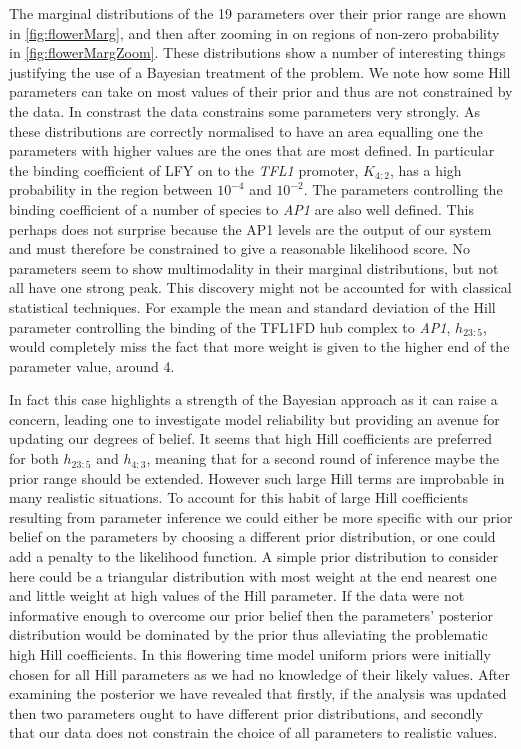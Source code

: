 The marginal distributions of the 19 parameters over their prior range are shown in \autoref{fig:flowerMarg}, and then after zooming in on regions of non-zero probability in \autoref{fig:flowerMargZoom}.
These distributions show a number of interesting things justifying the use of a Bayesian treatment of the problem.
We note how some Hill parameters can take on most values of their prior and thus are not constrained by the data.
In constrast the data constrains some parameters very strongly.
As these distributions are correctly normalised to have an area equalling one the parameters with higher values are the ones that are most defined.
In particular the binding coefficient of LFY on to the \emph{TFL1} promoter, $K_{4:2}$, has a high probability in the region between $10^{-4}$ and $10^{-2}$.
The parameters controlling the binding coefficient of a number of species to \emph{AP1} are also well defined.
This perhaps does not surprise because the AP1 levels are the output of our system and must therefore be constrained to give a reasonable likelihood score.
No parameters seem to show multimodality in their marginal distributions, but not all have one strong peak.
This discovery might not be accounted for with classical statistical techniques.
For example the mean and standard deviation of the Hill parameter controlling the binding of the TFL1FD hub complex to \emph{AP1}, $h_{23:5}$, would completely miss the fact that more weight is given to the higher end of the parameter value, around 4. 

In fact this case highlights a strength of the Bayesian approach as it can raise a concern, leading one to investigate model reliability but providing an avenue for updating our degrees of belief.
It seems that high Hill coefficients are preferred for both $h_{23:5}$ and $h_{4:3}$, meaning that for a second round of inference maybe the prior range should be extended.
However such large Hill terms are improbable in many realistic situations.
To account for this habit of large Hill coefficients resulting from parameter inference we could either be more specific with our prior belief on the parameters by choosing a different prior distribution, or one could add a penalty to the likelihood function.
A simple prior distribution to consider here could be a triangular distribution with most weight at the end nearest one and little weight at high values of the Hill parameter.
If the data were not informative enough to overcome our prior belief then the parameters' posterior distribution would be dominated by the prior thus alleviating the problematic high Hill coefficients.
In this flowering time model uniform priors were initially chosen for all Hill parameters as we had no knowledge of their likely values.
After examining the posterior we have revealed that firstly, if the analysis was updated then two parameters ought to have different prior distributions, and secondly that our data does not constrain the choice of all parameters to realistic values.

